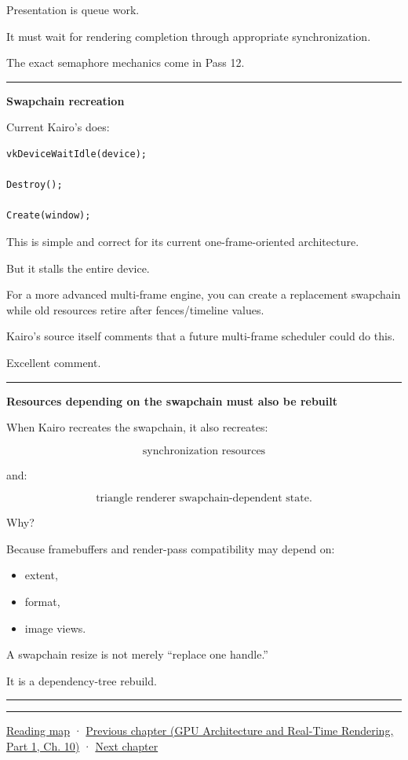 Presentation is queue work.

It must wait for rendering completion through appropriate synchronization.

The exact semaphore mechanics come in Pass 12.

\begin{center}\rule{0.5\linewidth}{0.5pt}\end{center}

\textbf{Swapchain recreation}

Current Kairo's  does:

\begin{verbatim}
vkDeviceWaitIdle(device);

Destroy();

Create(window);
\end{verbatim}

This is simple and correct for its current one-frame-oriented architecture.

But it stalls the entire device.

For a more advanced multi-frame engine, you can create a replacement swapchain while old resources retire after fences/timeline values.

Kairo's source itself comments that a future multi-frame scheduler could do this.

Excellent comment.

\begin{center}\rule{0.5\linewidth}{0.5pt}\end{center}

\textbf{Resources depending on the swapchain must also be rebuilt}

When Kairo recreates the swapchain, it also recreates:

\[
\text{synchronization resources}
\]

and:

\[
\text{triangle renderer swapchain-dependent state}.
\]

Why?

Because framebuffers and render-pass compatibility may depend on:

\begin{itemize}
\tightlist
\item
  extent,
\item
  format,
\item
  image views.
\end{itemize}

A swapchain resize is not merely ``replace one handle.''

It is a dependency-tree rebuild.

\begin{center}\rule{0.5\linewidth}{0.5pt}\end{center}

\begin{center}\rule{0.5\linewidth}{0.5pt}\end{center}

\hyperref[volume-reading-map]{Reading map} · \href{../06-GPU-Architecture-and-Real-Time-Rendering-P01/main.pdf\#nameddest=05-engine-i-ch019-gpu-work-and-reusable-metal-frames}{Previous chapter (GPU Architecture and Real-Time Rendering, Part 1, Ch. 10)} · \hyperref[05-engine-i-ch021-buffers-images-memory-and-uploads]{Next chapter}
